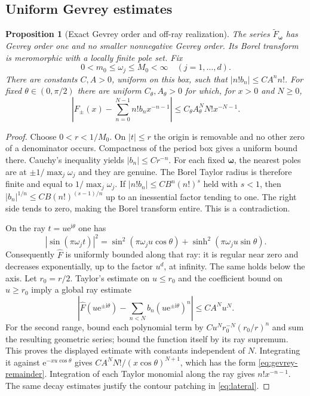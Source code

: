 \documentclass[11pt,a4paper]{article}
\numberwithin{equation}{section}
\newtheorem{proposition}[theorem]{Proposition}
\theoremstyle{definition}
\theoremstyle{remark}
\newcommand{\ii}{\mathrm i}
\newcommand{\e}{\mathrm e}
\newcommand{\bw}{\boldsymbol\omega}
\begin{document}
\subsection{Uniform Gevrey estimates}
\begin{proposition}[Exact Gevrey order and off-ray realization]
\label{prop:gevrey}
The series $\widetilde F_{\bw}$ has Gevrey order one and no smaller
nonnegative Gevrey order. Its Borel transform is meromorphic with a locally
finite pole set. Fix
\begin{equation}
 0<m_0\le\omega_j\le M_0<\infty
 \quad(j=1,\ldots,d).
 \label{eq:box}
\end{equation}
There are constants $C,A>0$, uniform on this box, such that
$|n!b_n|\le CA^n n!$. For fixed $\theta\in(0,\pi/2)$ there are uniform
$C_\theta,A_\theta>0$ for which, for $x>0$ and $N\ge0$,
\begin{equation}
 \left|F_\pm(x)-\sum_{n=0}^{N-1}n!b_n x^{-n-1}\right|
 \le C_\theta A_\theta^N N!x^{-N-1}.
 \label{eq:gevrey-remainder}
\end{equation}
\end{proposition}
\begin{proof}
Choose $0<r<1/M_0$. On $|t|\le r$ the origin is removable and no other
zero of a denominator occurs. Compactness of the period box gives a
uniform bound there. Cauchy's inequality yields $|b_n|\le Cr^{-n}$.
For each fixed $\bw$, the nearest poles are at
$\pm1/\max_j\omega_j$ and they are genuine. The Borel Taylor radius is
therefore finite and equal to $1/\max_j\omega_j$.
If $|n!b_n|\le CB^n(n!)^s$ held with $s<1$, then
$|b_n|^{1/n}\le CB(n!)^{(s-1)/n}$ up to an inessential factor tending to
one. The right side tends to zero, making the Borel transform entire.
This is a contradiction.

On the ray $t=u\e^{\ii\theta}$ one has
\[
 |\sin(\pi\omega_jt)|^2
 =\sin^2(\pi\omega_ju\cos\theta)
  +\sinh^2(\pi\omega_ju\sin\theta).
\]
Consequently $\widehat F$ is uniformly bounded along that ray: it is
regular near zero and decreases exponentially, up to the factor $u^d$,
at infinity. The same holds below the axis.
Let $r_0=r/2$. Taylor's estimate on $u\le r_0$ and the coefficient bound
on $u\ge r_0$ imply a global ray estimate
\[
 \left|\widehat F(u\e^{\pm\ii\theta})
       -\sum_{n<N}b_n(u\e^{\pm\ii\theta})^n\right|
 \le C A^N u^N.
\]
For the second range, bound each polynomial term by
$Cu^N r_0^{-N}(r_0/r)^n$ and sum the resulting geometric series;
bound the function itself by its ray supremum. This proves the displayed
estimate with constants independent of $N$.
Integrating it against $\e^{-xu\cos\theta}$ gives
$CA^NN!/(x\cos\theta)^{N+1}$, which has the form
\eqref{eq:gevrey-remainder}. Integration of each Taylor monomial along
the ray gives $n!x^{-n-1}$. The same decay estimates justify the contour
patching in \eqref{eq:lateral}.
\end{proof}
\end{document}
